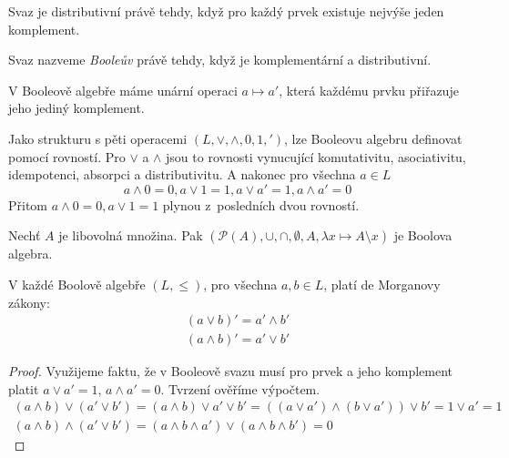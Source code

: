 \begin{claim}
    Svaz je distributivní právě tehdy, když
    pro každý prvek existuje nejvýše jeden komplement.
\end{claim}

\begin{definition}
    Svaz nazveme {\em Booleův} právě tehdy, když je komplementární a
    distributivní.
\end{definition}

\begin{corollary}
V Booleově algebře máme unární operaci $a \mapsto a'$, která každému
prvku přiřazuje jeho jediný komplement.
\end{corollary}

Jako strukturu s pěti operacemi $(L, \vee, \wedge, 0, 1, {'})$,
lze Booleovu algebru definovat pomocí rovností.
Pro $\vee$ a $\wedge$ jsou to rovnosti vynucující
komutativitu, asociativitu, idempotenci,
absorpci a distributivitu. A nakonec pro všechna $a \in L$
$$a \wedge 0 = 0, a \vee 1 = 1, a \vee a' = 1, a \wedge a' = 0$$
Přitom $a \wedge 0 = 0, a \vee 1 = 1$ plynou z~posledních dvou rovností.

\begin{example}
    Nechť $A$ je libovolná množina.
    Pak $(\mathcal{P}(A), \cup, \cap, \emptyset, A,
        \lambda x \mapsto A \setminus x)$ je Boolova algebra.
\end{example}

\begin{claim}
    V každé Boolově algebře $(L, \leq)$, pro všechna $a,b \in L$,
    platí de Morganovy zákony:
    \begin{align*}
    (a \vee b)' = a' \wedge b'\\
    (a \wedge b)' = a' \vee b'
    \end{align*}
\end{claim}

\begin{proof}
    Využijeme faktu, že v Booleově svazu musí pro prvek a jeho
    komplement
    platit $a \vee a' = 1$, $a \wedge a' = 0$. Tvrzení ověříme výpočtem.
    \begin{gather*}
    (a \wedge b) \vee (a' \vee b') = (a \wedge b) \vee a' \vee b' =
        ((a \vee a') \wedge (b \vee a')) \vee b' = 1 \vee a' = 1\\
    (a \wedge b) \wedge (a' \vee b') =
        (a \wedge b \wedge a') \vee (a \wedge b \wedge b') = 0
    \end{gather*}
\end{proof}

